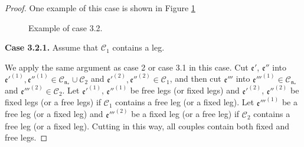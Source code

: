 \begin{proof}
    One example of this case is shown in Figure \ref{fig.examplecase3.2.fourwave}
    \begin{figure}[H]
     \centering
     \caption{Example of case 3.2.}
     \label{fig.examplecase3.2.fourwave}
    \end{figure}
     
    \textbf{Case 3.2.1.} Assume that $\mathcal{C}_1$ contains a leg. 
    
    We apply the same argument as case 2 or case 3.1 in this case. Cut $\mathfrak{e}'$, $\mathfrak{e}''$ into $\mathfrak{e}'^{(1)}, \mathfrak{e}''^{(1)}\in \mathcal{C}_{\mathfrak{n}_*}\cup \mathcal{C}_2$ and $\mathfrak{e}'^{(2)}, \mathfrak{e}''^{(2)}\in \mathcal{C}_1$, and then cut $\mathfrak{e}'''$ into $\mathfrak{e}'''^{(1)}\in \mathcal{C}_{\mathfrak{n}_*}$ and $\mathfrak{e}'''^{(2)}\in \mathcal{C}_2$. Let $\mathfrak{e}'^{(1)}$, $\mathfrak{e}''^{(1)}$ be free legs (or fixed legs) and $\mathfrak{e}'^{(2)}$, $\mathfrak{e}''^{(2)}$ be fixed legs (or a free legs) if $\mathcal{C}_1$ contains a free leg (or a fixed leg). Let $\mathfrak{e}'''^{(1)}$ be a free leg (or a fixed leg) and $\mathfrak{e}'''^{(2)}$ be a fixed leg (or a free leg) if $\mathcal{C}_2$ contains a free leg (or a fixed leg). Cutting in this way, all couples contain both fixed and free legs.
    

\end{proof}
